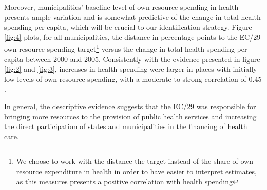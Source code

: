



Moreover, municipalities' baseline level of own resource spending in health presents ample variation and is somewhat predictive of the change in total health spending per capita, which will be crucial to our identification strategy. Figure \ref{fig:4} plots, for all municipalities, the distance in percentage points to the EC/29 own resource spending target\footnote{We choose to work with the distance the target instead of the share of own resource expenditure in health in order to have easier to interpret estimates, as this measures presents a positive correlation with health spending} versus the change in total health spending per capita between 2000 and 2005. Consistently with the evidence presented in figure \ref{fig:2} and \ref{fig:3}, increases in health spending were larger in places with initially low levels of own resource spending, with a moderate to strong correlation of $0.45$.





In general, the descriptive evidence suggests that the EC/29 was responsible for bringing more resources to the provision of public health services and increasing the direct participation of states and municipalities in the financing of health care.
